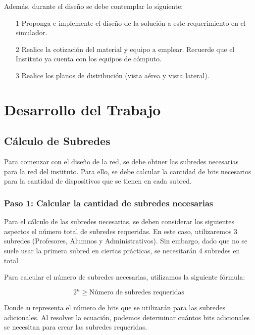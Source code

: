Además, durante el diseño se debe contemplar lo siguiente:

\begin{enumerate}
    \item [1] Proponga e implemente el diseño de la solución a este requerimiento en el simulador.
    \item [2] Realice la cotización del material y equipo a emplear. Recuerde que el Instituto ya cuenta con los equipos de cómputo.
    \item [3] Realice los planos de distribución (vista aérea y vista lateral).
\end{enumerate}

\section{Desarrollo del Trabajo}

    \subsection{Cálculo de Subredes}

    Para comenzar con el diseño de la red, se debe obtner las subredes necesarias para la red del instituto. Para ello, se debe calcular la cantidad de bits necesarios para la cantidad de dispositivos que se tienen en cada subred.

    \subsubsection*{Paso 1: Calcular la cantidad de subredes necesarias}

    Para el cálculo de las subredes necesarias, se deben considerar los siguientes aspectos el número total de subredes requeridas. En este caso, utilizaremos 3 subredes (Profesores, Alumnos y Administrativos). Sin embargo, dado que no se suele usar la primera subred en ciertas prácticas, se necesitarán 4 subredes en total

    Para calcular el número de subredes necesarias, utilizamos la siguiente fórmula:

    \begin{equation} 
        2^{n} \geq \text{Número de subredes requeridas} 
    \label{eq:subredes} 
    \end{equation}

    Donde \textbf{n} representa el número de bits que se utilizarán para las subredes adicionales. Al resolver la ecuación, podemos determinar cuántos bits adicionales se necesitan para crear las subredes requeridas.

